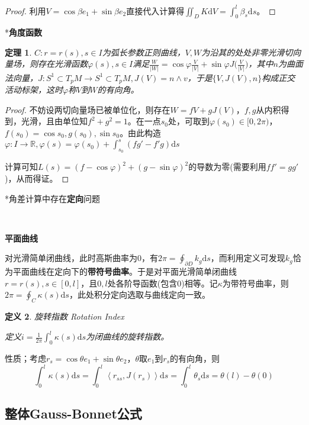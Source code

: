 \documentclass[a4paper,UTF8,fontset=windows]{ctexart}
\newtheorem{thm}{定理}[section]
\newtheorem{dfn}[thm]{定义}
\begin{document}
\begin{proof}
利用$V=\cos\beta e_1+\sin\beta e_2$直接代入计算得$\iint_DK\mathrm{d}V=\int_0^l\beta_s\mathrm{d}s$。
\end{proof}

*\textbf{角度函数}

\begin{thm}
$C:r=r(s),s\in I$为弧长参数正则曲线，$V,W$为沿其的处处非零光滑切向量场，则存在光滑函数$\varphi(s),s\in I$满足$\frac{W}{|W|}=\cos\varphi\frac{V}{|V|}+\sin\varphi J\big(\frac{V}{|V|}\big)$，其中$n$为曲面法向量，$J:S^1\subset T_pM\to S^1\subset T_pM,J(V)=n\wedge v$，于是$\{V,J(V),n\}$构成正交活动标架，这时$\varphi$称$V$到$W$的有向角。
\end{thm}

\begin{proof}
不妨设两切向量场已被单位化，则存在$W=fV+gJ(V)$，$f,g$从内积得到，光滑，且由单位知$f^2+g^2=1$。在一点$s_0$处，可取到$\varphi(s_0)\in[0,2\pi)$，$f(s_0)=\cos s_0,g(s_0),\sin s_0$。由此构造$\varphi:I\to\mathbb{R},\varphi(s)=\varphi(s_0)+\int_{s_0}^s(fg'-f'g)\mathrm{d}s$

计算可知$L(s)=(f-\cos\varphi)^2+(g-\sin\varphi)^2$的导数为零(需要利用$ff'=gg'$)，从而得证。
\end{proof}

*角差计算中存在\textbf{定向}问题

\

\textbf{平面曲线}

对光滑简单闭曲线，此时高斯曲率为0，有$2\pi=\oint_{\partial D}k_g\mathrm{d}s$，而利用定义可发现$k_g$恰为平面曲线在定向下的\textbf{带符号曲率}。于是对平面光滑简单闭曲线$r=r(s),s\in[0,l]$，且$0,l$处各阶导函数(包含0)相等。记$\kappa$为带符号曲率，则$2\pi=\oint_C\kappa(s)\mathrm{d}s$，此处积分定向选取与曲线定向一致。

\begin{dfn} 旋转指数 Rotation Index

定义$i=\frac{1}{2\pi}\int_0^l\kappa(s)\mathrm{d}s$为闭曲线的旋转指数。
\end{dfn}

性质；考虑$r_s=\cos\theta e_1+\sin\theta e_2$，$\theta$取$e_1$到$r_s$的有向角，则
$$\int_0^l\kappa(s)\mathrm{d}s=\int_0^l\left<r_{ss},J(r_s)\right>\mathrm{d}s=\int_0^l\theta_s\mathrm{d}s=\theta(l)-\theta(0)$$

\subsection{整体Gauss-Bonnet公式}
\end{document}
